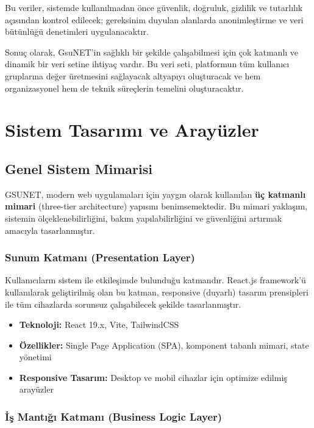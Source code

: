 \documentclass[a4paper,12pt]{report}
\begin{document}
Bu veriler, sistemde kullanılmadan önce güvenlik, doğruluk, gizlilik ve tutarlılık açısından kontrol edilecek; gereksinim duyulan alanlarda anonimleştirme ve veri bütünlüğü denetimleri uygulanacaktır.

\bigskip

Sonuç olarak, GsuNET’in sağlıklı bir şekilde çalışabilmesi için çok katmanlı ve dinamik bir veri setine ihtiyaç vardır. Bu veri seti, platformun tüm kullanıcı gruplarına değer üretmesini sağlayacak altyapıyı oluşturacak ve hem organizasyonel hem de teknik süreçlerin temelini oluşturacaktır.


\chapter{Sistem Tasarımı ve Arayüzler}

\section{Genel Sistem Mimarisi}

GSUNET, modern web uygulamaları için yaygın olarak kullanılan \textbf{üç katmanlı mimari} (three-tier architecture) yapısını benimsemektedir. Bu mimari yaklaşım, sistemin ölçeklenebilirliğini, bakım yapılabilirliğini ve güvenliğini artırmak amacıyla tasarlanmıştır.

\subsection{Sunum Katmanı (Presentation Layer)}

Kullanıcıların sistem ile etkileşimde bulunduğu katmandır. React.js framework'ü kullanılarak geliştirilmiş olan bu katman, responsive (duyarlı) tasarım prensipleri ile tüm cihazlarda sorunsuz çalışabilecek şekilde tasarlanmıştır.

\begin{itemize}
    \item \textbf{Teknoloji:} React 19.x, Vite, TailwindCSS
    \item \textbf{Özellikler:} Single Page Application (SPA), komponent tabanlı mimari, state yönetimi
    \item \textbf{Responsive Tasarım:} Desktop ve mobil cihazlar için optimize edilmiş arayüzler
\end{itemize}

\subsection{İş Mantığı Katmanı (Business Logic Layer)}
\end{document}
